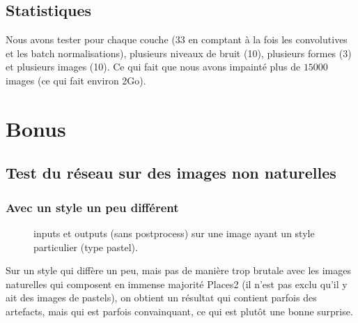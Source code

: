 \documentclass[12pt]{article}
\begin{document}
\subsection{Statistiques}
Nous avons tester pour chaque couche (33 en comptant à la fois les convolutives et les batch normalisations), plusieurs niveaux de bruit (10), plusieurs formes (3) et plusieurs images (10). Ce qui fait que nous avons impainté plus de $15000$ images (ce qui fait environ 2Go).


\section{Bonus}

\subsection{Test du réseau sur des images non naturelles}

\subsubsection*{Avec un style un peu différent}
\begin{figure}[htb]
\centering
  \hfill
  \hfill
  \hfill
  \hfill
\end{figure}
\begin{figure}[htb]
\centering
  \hfill
  \hfill
  \hfill
  \hfill
  \caption{inputs et outputs (sans postprocess) sur une image ayant un style particulier (type pastel).}\label{fig:occlus_dynamic}
\end{figure}

Sur un style qui diffère un peu, mais pas de manière trop brutale avec les images naturelles qui composent en immense majorité Places2 (il n'est pas exclu qu'il y ait des images de pastels), on obtient un résultat qui contient parfois des artefacts, mais qui est parfois convainquant, ce qui est plutôt une bonne surprise.
\end{document}
